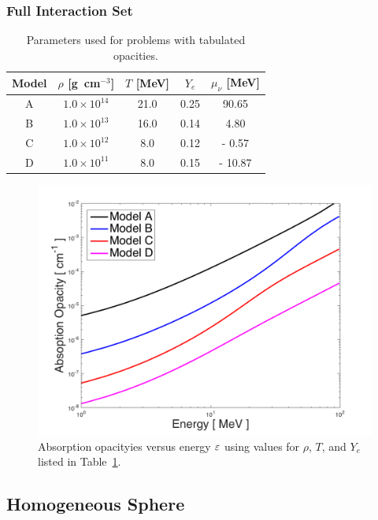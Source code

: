 \documentclass[10pt,preprint]{aastex}
\begin{document}
\subsubsection{Full Interaction Set}

\begin{table}
  \caption{Parameters used for problems with tabulated opacities. \label{tab:tabulatedModels}}
  \begin{tabular}{ccccc}
    Model & $\rho$ [g~cm$^{-3}$] & $T$ [MeV] & $Y_{e}$ & $\mu_{\nu}$ [MeV] \\
    \midrule \midrule
    A & $1.0\times10^{14}$ & 21.0  & 0.25 &   90.65 \\
    B & $1.0\times10^{13}$ & 16.0 & 0.14 &     4.80 \\
    C & $1.0\times10^{12}$ &   8.0 & 0.12 & -   0.57 \\
    D & $1.0\times10^{11}$ &   8.0 & 0.15 & - 10.87 \\
    \midrule \midrule
  \end{tabular}
\end{table}

\begin{figure}
  \begin{center}
    \includegraphics[scale=0.8]{./Figures/HomogeneousSphere_Opacities}
  \end{center}
  \caption{Absorption opacityies versus energy $\varepsilon$ using values for $\rho$, $T$, and $Y_{e}$ listed in Table~\ref{tab:tabulatedModels}.}
  \label{fig:absorptionOpacities_weaklib}
\end{figure}

\subsection{Homogeneous Sphere}
\end{document}
